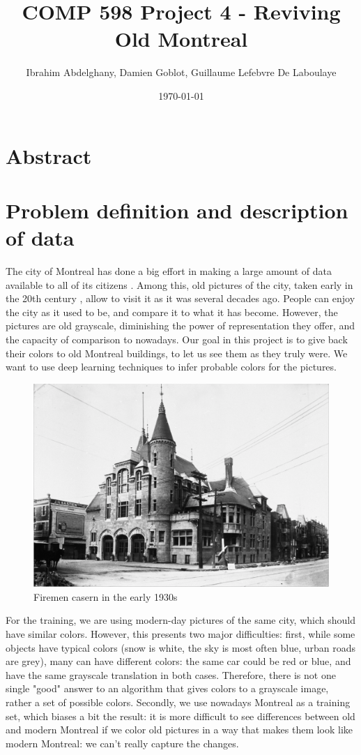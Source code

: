\documentclass[10pt,twocolumn]{article}
\title{\Large COMP 598 Project 4 - Reviving Old Montreal}
\author{\normalsize Ibrahim Abdelghany,  Damien Goblot, Guillaume Lefebvre De Laboulaye}
\date{\normalsize \today}
\begin{document}
 
\maketitle 
{} 

\section*{Abstract}

\section{Problem definition and description of data} 

The city of Montreal has done a big effort in making a large amount of data available to all of its citizens \cite{montrealData}. Among this, old pictures of the city, taken early in the 20th century \cite{datasetOldMontreal}, allow to visit it as it was several decades ago. People can enjoy the city as it used to be, and compare it to what it has become. However, the pictures are old grayscale, diminishing the power of representation they offer, and the capacity of comparison to nowadays. Our goal in this project is to give back their colors to old Montreal buildings, to let us see them as they truly were. We want to use deep learning techniques to infer probable colors for the pictures. 

\begin{figure}[h]
\centering 
 \includegraphics[width=7.7 cm]{old_montreal.png} 
\caption{\scriptsize Firemen casern in the early 1930s}
\end{figure} 


For the training, we are using modern-day pictures of the same city, which should have similar colors. However, this presents two major difficulties: first, while some objects have typical colors (snow is white, the sky is most often blue, urban roads are grey), many can have different colors: the same car could be red or blue, and have the same grayscale translation in both cases. Therefore, there is not one single "good" answer to an algorithm that gives colors to a grayscale image, rather a set of possible colors. Secondly, we use nowadays Montreal as a training set, which biases a bit the result: it is more difficult to see differences between old and modern Montreal if we color old pictures in a way that makes them look like modern Montreal: we can't really capture the changes.
\end{document}
